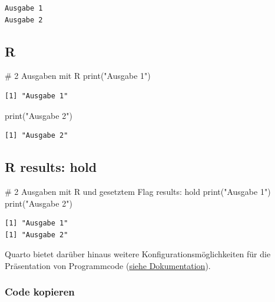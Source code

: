 \documentclass[
  letterpaper,
  DIV=11]{scrartcl}
\newenvironment{Shaded}{\begin{snugshade}}{\end{snugshade}}
\newcommand{\CommentTok}[1]{\textcolor[rgb]{0.37,0.37,0.37}{#1}}
\newcommand{\FunctionTok}[1]{\textcolor[rgb]{0.28,0.35,0.67}{#1}}
\newcommand{\NormalTok}[1]{\textcolor[rgb]{0.00,0.23,0.31}{#1}}
\newcommand{\StringTok}[1]{\textcolor[rgb]{0.13,0.47,0.30}{#1}}
\begin{document}
\begin{verbatim}
Ausgabe 1
Ausgabe 2
\end{verbatim}

\subsection{R}

\begin{Shaded}
\begin{Highlighting}[]
\CommentTok{\# 2 Ausgaben mit R}
\FunctionTok{print}\NormalTok{(}\StringTok{"Ausgabe 1"}\NormalTok{)}
\end{Highlighting}
\end{Shaded}

\begin{verbatim}
[1] "Ausgabe 1"
\end{verbatim}

\begin{Shaded}
\begin{Highlighting}[]
\FunctionTok{print}\NormalTok{(}\StringTok{"Ausgabe 2"}\NormalTok{)}
\end{Highlighting}
\end{Shaded}

\begin{verbatim}
[1] "Ausgabe 2"
\end{verbatim}

\subsection{R results: hold}

\begin{Shaded}
\begin{Highlighting}[]
\CommentTok{\# 2 Ausgaben mit R und gesetztem Flag results: hold}
\FunctionTok{print}\NormalTok{(}\StringTok{"Ausgabe 1"}\NormalTok{)}
\FunctionTok{print}\NormalTok{(}\StringTok{"Ausgabe 2"}\NormalTok{)}
\end{Highlighting}
\end{Shaded}

\begin{verbatim}
[1] "Ausgabe 1"
[1] "Ausgabe 2"
\end{verbatim}

Quarto bietet darüber hinaus weitere Konfigurationsmöglichkeiten für die
Präsentation von Programmcode
(\href{https://quarto.org/docs/output-formats/html-code.html\#overview}{siehe
Dokumentation}).

\subsubsection{Code kopieren}\label{code-kopieren}
\end{document}
